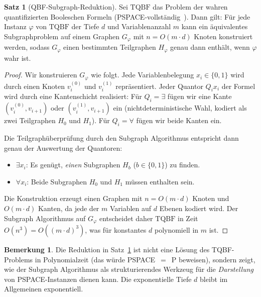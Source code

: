 ﻿\documentclass[a4paper,12pt]{article}
\theoremstyle{definition}
\newtheorem{satz}{Satz}
\newtheorem{bemerkung}{Bemerkung}
\begin{document}
\begin{satz}[QBF-Subgraph-Reduktion]
\label{satz:qbf}
  Sei $\mathrm{TQBF}$ das Problem der wahren quantifizierten Booleschen Formeln
  (PSPACE-vollständig~\cite{stockmeyer1973word}).
  Dann gilt: Für jede Instanz $\varphi$ von $\mathrm{TQBF}$ der Tiefe $d$ und
  Variablenanzahl $m$ kann ein äquivalentes Subgraphproblem auf einem
  Graphen $G_\varphi$ mit $n = O(m \cdot d)$ Knoten konstruiert werden,
  sodass $G_\varphi$ einen bestimmten Teilgraphen $H_\varphi$ genau dann enthält,
  wenn $\varphi$ wahr ist.
\end{satz}

\begin{proof}
  Wir konstruieren $G_\varphi$ wie folgt.
  Jede Variablenbelegung $x_i \in \{0, 1\}$ wird durch einen Knoten $v_i^{(0)}$
  und $v_i^{(1)}$ repräsentiert.
  Jeder Quantor $Q_i x_i$ der Formel wird durch eine Kantenschicht realisiert:
  Für $Q_i = \exists$ fügen wir eine Kante $(v_i^{(0)}, v_{i+1})$ oder
  $(v_i^{(1)}, v_{i+1})$ ein (nichtdeterministische Wahl, kodiert als zwei
  Teilgraphen $H_0$ und $H_1$).
  Für $Q_i = \forall$ fügen wir beide Kanten ein.

  Die Teilgraphüberprüfung durch den Subgraph Algorithmus entspricht dann
  genau der Auswertung der Quantoren:
  \begin{itemize}
    \item $\exists x_i$: Es genügt, \emph{einen} Subgraphen $H_b$ ($b \in \{0,1\}$) zu finden.
    \item $\forall x_i$: Beide Subgraphen $H_0$ und $H_1$ müssen enthalten sein.
  \end{itemize}

  Die Konstruktion erzeugt einen Graphen mit $n = O(m \cdot d)$ Knoten und
  $O(m \cdot d)$ Kanten, da jede der $m$ Variablen auf $d$ Ebenen kodiert wird.
  Der Subgraph Algorithmus auf $G_\varphi$ entscheidet daher $\mathrm{TQBF}$
  in Zeit $O(n^3) = O((m \cdot d)^3)$, was für konstantes $d$ polynomiell in $m$ ist.
\end{proof}

\begin{bemerkung}
  Die Reduktion in Satz~\ref{satz:qbf} ist nicht eine Lösung des TQBF-Problems
  in Polynomialzeit (das würde PSPACE~$=$~P beweisen), sondern zeigt,
  wie der Subgraph Algorithmus als strukturierendes Werkzeug für die
  \emph{Darstellung} von PSPACE-Instanzen dienen kann.
  Die exponentielle Tiefe $d$ bleibt im Allgemeinen exponentiell.
\end{bemerkung}
\end{document}
